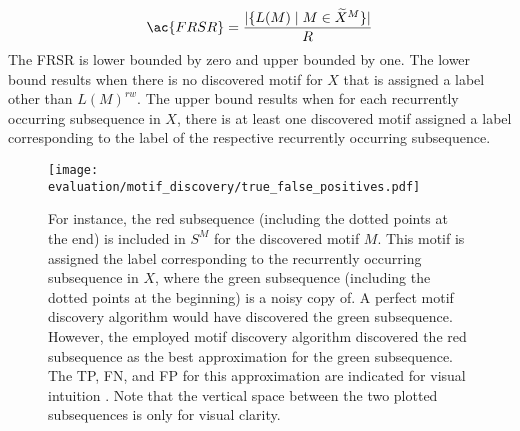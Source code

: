 \begin{equation}
\ac{FRSR} = \frac{|\{L(M) \mid M \in \widetilde{X}^M \}|}{R}
\label{eq:frsr}
\end{equation}
The \ac{FRSR} is lower bounded by zero and upper bounded by one. The lower bound results when there is no discovered motif for $X$ that is assigned a label other than $L(M)^{rw}$. The upper bound results when for each recurrently occurring subsequence in $X$, there is at least one discovered motif assigned a label corresponding to the label of the respective recurrently occurring subsequence.
\begin{figure}[htb]
\centering
\texttt{[image: evaluation/motif\_discovery/true\_false\_positives.pdf]}
\caption[Evaluation Motif Discovery - Intuition for Recall and Precision]{For instance, the red subsequence (including the dotted points at the end) is included in $S^M$ for the discovered motif $M$. This motif is assigned the label corresponding to the recurrently occurring subsequence in $X$, where the green subsequence (including the dotted points at the beginning) is a noisy copy of. A perfect motif discovery algorithm would have discovered the green subsequence. However, the employed motif discovery algorithm discovered the red subsequence as the best approximation for the green subsequence. The \ac{TP}, \ac{FN}, and \ac{FP} for this approximation are indicated for visual intuition \cite{Diss_VW}. Note that the vertical space between the two plotted subsequences is only for visual clarity.}
\label{fig:true_false_positives}
\end{figure}
